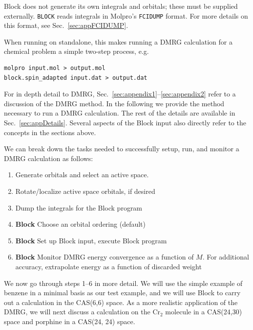 \documentclass[letterpaper,12pt,aps, pra]{revtex4-1}
\begin{document}
Block does not generate its own integrals and orbitals; these must be supplied
externally. 
\texttt{BLOCK} reads integrals in Molpro's \texttt{FCIDUMP} format. For more details
on this format, see Sec.~\ref{sec:appFCIDUMP}.

When running on standalone, this makes
running a DMRG calculation for a chemical problem a simple two-step process,
e.g.

\begin{verbatim}
molpro input.mol > output.mol
block.spin_adapted input.dat > output.dat
\end{verbatim}

For in depth detail to DMRG, Sec.~\ref{sec:appendix1}--\ref{sec:appendix2}
refer to a discussion of the DMRG method.  In the following we provide the
method necessary to run a DMRG calculation.  The rest of the details are
available in Sec.~\ref{sec:appDetails}.  Several aspects of the Block input
also directly refer to the concepts in the sections above.

We can break down the tasks needed to successfully setup, run, and monitor a DMRG calculation as follows:
\begin{enumerate}
\item  Generate orbitals and select an active space. 
\item  Rotate/localize active space orbitals, if desired
\item  Dump the integrals for the Block program
\item {\bf Block} Choose an orbital ordering (default)
\item {\bf Block} Set up Block input, execute Block program
\item {\bf Block} Monitor DMRG energy convergence as a function of $M$. For additional accuracy, extrapolate energy as a function of discarded weight 
\end{enumerate}


We now go through steps 1--6 in more detail. We will use the simple example of benzene in a minimal basis as our test example, and we will use Block
to carry out a calculation in the CAS(6,6) space. As a more realistic application of the DMRG, we will next discuss a calculation on the Cr$_2$ molecule
in a CAS(24,30) space and porphine in a CAS(24, 24) space.
\end{document}
